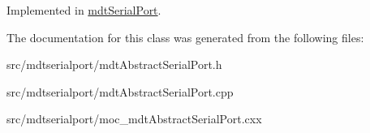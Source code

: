 Implemented in \hyperlink{classmdt_serial_port_a9d1402c229401343a3bf66eeda4fe9da}{mdtSerialPort}.



The documentation for this class was generated from the following files:\begin{DoxyCompactItemize}
\item 
src/mdtserialport/mdtAbstractSerialPort.h\item 
src/mdtserialport/mdtAbstractSerialPort.cpp\item 
src/mdtserialport/moc\_\-mdtAbstractSerialPort.cxx\end{DoxyCompactItemize}

